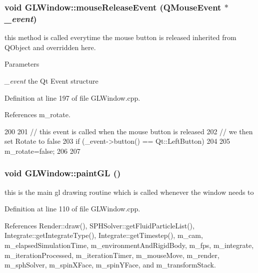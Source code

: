\hypertarget{class_g_l_window_ab9e5741b8c69d2f6447a5fc6d9d704c8}{
\subsubsection[{mouseReleaseEvent}]{\setlength{\rightskip}{0pt plus 5cm}void GLWindow::mouseReleaseEvent (QMouseEvent $\ast$ {\em \_\-event})}}
\label{class_g_l_window_ab9e5741b8c69d2f6447a5fc6d9d704c8}


this method is called everytime the mouse button is released inherited from QObject and overridden here. 


\begin{DoxyParams}{Parameters}
\item[{\em \_\-event}]the Qt Event structure \end{DoxyParams}


Definition at line 197 of file GLWindow.cpp.



References m\_\-rotate.




\begin{DoxyCode}
200 {
201   // this event is called when the mouse button is released
202   // we then set Rotate to false
203   if (_event->button() == Qt::LeftButton)
204   {
205     m_rotate=false;
206   }
207 }
\end{DoxyCode}


\hypertarget{class_g_l_window_a9bd2503dd5f812c10a9481f22ecd3403}{
\subsubsection[{paintGL}]{\setlength{\rightskip}{0pt plus 5cm}void GLWindow::paintGL ()}}
\label{class_g_l_window_a9bd2503dd5f812c10a9481f22ecd3403}


this is the main gl drawing routine which is called whenever the window needs to 



Definition at line 110 of file GLWindow.cpp.



References Render::draw(), SPHSolver::getFluidParticleList(), Integrate::getIntegrateType(), Integrate::getTimestep(), m\_\-cam, m\_\-elapsedSimulationTime, m\_\-environmentAndRigidBody, m\_\-fps, m\_\-integrate, m\_\-iterationProcessed, m\_\-iterationTimer, m\_\-mouseMove, m\_\-render, m\_\-sphSolver, m\_\-spinXFace, m\_\-spinYFace, and m\_\-transformStack.




